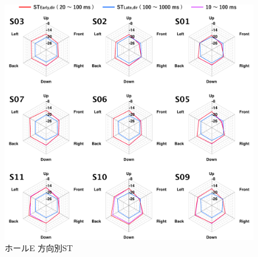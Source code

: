 \documentclass[11pt,a4j]{jreport}
\begin{document}
\begin{figure}[H]
  \centering
  \includegraphics[scale=.77]{images/realHallDirSt/allPoint/reshaped/e.pdf}
  \caption{ホールE 方向別ST}
  \label{fig:ホールE 方向別ST}
\end{figure}

\newpage
\vspace{4\baselineskip}
\end{document}

